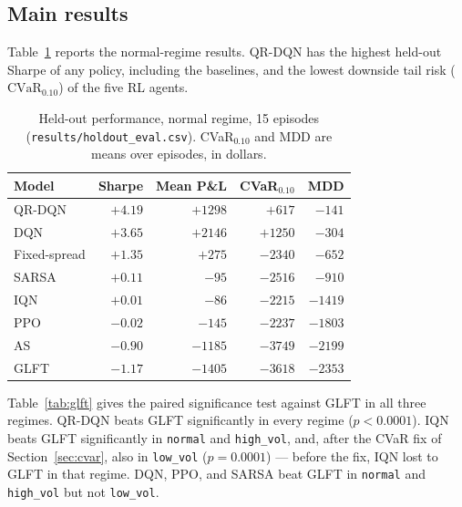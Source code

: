 \documentclass[10pt,twocolumn]{article}
\begin{document}
\subsection{Main results}
\label{sec:main-results}
Table~\ref{tab:main} reports the normal-regime results. QR-DQN has the highest held-out Sharpe of any policy, including the baselines, and the lowest downside tail risk ($\mathrm{CVaR}_{0.10}$) of the five RL agents.

\begin{table}[t]
\centering\footnotesize
\begin{tabular}{lrrrr}
\toprule
Model & Sharpe & Mean P\&L & CVaR$_{0.10}$ & MDD \\
\midrule
QR-DQN       & $+4.19$ & $+1298$ & $+617$  & $-141$ \\
DQN          & $+3.65$ & $+2146$ & $+1250$ & $-304$ \\
Fixed-spread & $+1.35$ & $+275$  & $-2340$ & $-652$ \\
SARSA        & $+0.11$ & $-95$   & $-2516$ & $-910$ \\
IQN          & $+0.01$ & $-86$   & $-2215$ & $-1419$ \\
PPO          & $-0.02$ & $-145$  & $-2237$ & $-1803$ \\
AS           & $-0.90$ & $-1185$ & $-3749$ & $-2199$ \\
GLFT         & $-1.17$ & $-1405$ & $-3618$ & $-2353$ \\
\bottomrule
\end{tabular}
\caption{Held-out performance, normal regime, 15 episodes (\texttt{results/holdout\_eval.csv}). CVaR$_{0.10}$ and MDD are means over episodes, in dollars.}
\label{tab:main}
\end{table}

Table~\ref{tab:glft} gives the paired significance test against GLFT in all three regimes. QR-DQN beats GLFT significantly in every regime ($p<0.0001$). IQN beats GLFT significantly in \texttt{normal} and \texttt{high\_vol}, and, after the CVaR fix of Section~\ref{sec:cvar}, also in \texttt{low\_vol} ($p=0.0001$) --- before the fix, IQN lost to GLFT in that regime. DQN, PPO, and SARSA beat GLFT in \texttt{normal} and \texttt{high\_vol} but not \texttt{low\_vol}.
\end{document}
